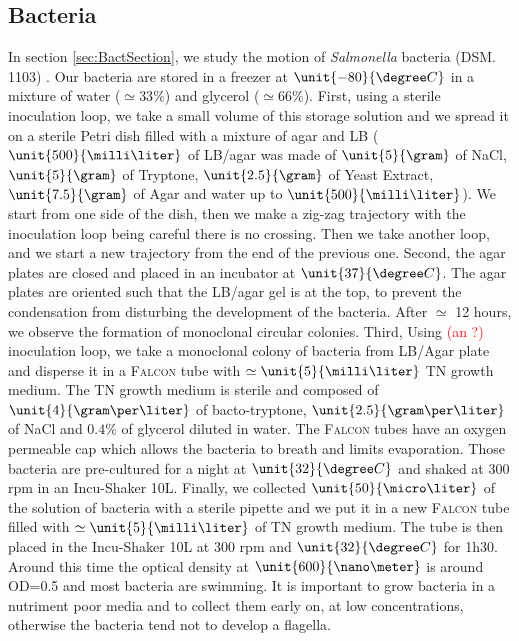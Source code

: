 \documentclass[%
 aip,
 jmp,%
 amsmath,amssymb,
reprint,%
]{revtex4-1}
\begin{document}

\subsection{Bacteria}

In section \ref{sec:BactSection}, we study the motion of \textit{Salmonella} bacteria (DSM. 1103) \citep{21_fabrega2013salmonella}. Our bacteria are stored in a freezer at $\unit{-80}{\degree C}$ in a mixture of water ($\simeq \unit{33}{\%}$) and glycerol ($\simeq \unit{66}{\%}$). First, using a sterile inoculation loop, we take a small volume of this storage solution  and we spread it on a sterile Petri dish filled with a mixture of agar and LB ($\unit{500}{\milli\liter}$ of LB/agar was made of $\unit{5}{\gram}$ of NaCl, $\unit{5}{\gram}$ of Tryptone, $\unit{2.5}{\gram}$ of Yeast Extract, $\unit{7.5}{\gram}$ of Agar and water up to $\unit{500}{\milli\liter}$). We start from one side of the dish, then we make a zig-zag trajectory with the inoculation loop being careful there is no crossing. Then we take another loop, and we start a new trajectory from the end of the previous one. Second, the agar plates are closed and placed in an incubator at $\unit{37}{\degree C}$. The agar plates are oriented such that the LB/agar gel is at the top, to prevent the condensation from disturbing the development of the bacteria. After $\simeq$ 12 hours, we observe the formation of monoclonal circular colonies. Third, Using \textcolor{red}{(an ?)} inoculation loop, we take a monoclonal colony of bacteria from LB/Agar plate and disperse it in a \textsc{Falcon} tube with $\simeq \unit{5}{\milli\liter}$ TN growth medium. The TN growth medium is sterile and composed of $\unit{4}{\gram\per\liter}$ of bacto-tryptone, $\unit{2.5}{\gram\per\liter}$ of NaCl and $0.4\%$ of glycerol diluted in water. The \textsc{Falcon} tubes have an oxygen permeable cap which allows the bacteria to breath and limits evaporation. Those bacteria are pre-cultured for a night at $\unit{32}{\degree C}$ and shaked at 300 rpm in an Incu-Shaker 10L. Finally, we collected $\unit{50}{\micro\liter}$ of the solution of bacteria with a sterile pipette and we put it in a new \textsc{Falcon} tube filled with $\simeq \unit{5}{\milli\liter}$ of TN growth medium. The tube is then placed in the Incu-Shaker 10L at 300 rpm and $\unit{32}{\degree C}$ for 1h30. Around this time the optical density at $\unit{600}{\nano\meter}$ is around OD=0.5 and most bacteria are swimming. It is important to grow bacteria in a nutriment poor media and to collect them early on, at low concentrations, otherwise the bacteria tend not to develop a flagella.
\end{document}
